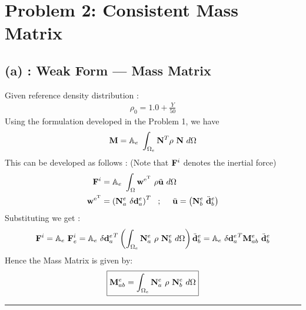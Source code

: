 \section*{Problem 2: Consistent Mass Matrix}
\subsection*{(a) : Weak Form --- Mass Matrix}
Given reference density distribution : 
\begin{align*}
\rho_0
=
1.0
+
\frac{Y}{50}
\end{align*}
Using the formulation developed in the Problem 1, we have \begin{align*}
{\bf M}
=
\mathbb{A}_e\ \int_{\Omega_e}
{\bf N}^T \rho \ {\bf N}\ d\Omega
\end{align*}
This can be developed as follows : (Note that ${\bf F}^i$ denotes the inertial force) 
\begin{align*}
{\bf F}^{i}
& = 
\mathbb{A}_e\ 
\int_{\Omega}
{\bf w}^{\rm e^{T}}\ \rho
\ddot{\bf u}\ d\Omega \\
{\bf w}^{\rm e^{T}}
& =
\left(
{\bf N}^e_a\ \delta {\bf d}^e_a
\right)^T \ \ ; \ \ \ \ \ddot{\bf u} = 
\left(
{\bf N}^e_b\ \ddot{\bf d}^e_b
\right)
\end{align*}
Substituting we get : 
\begin{align*}
{\bf F}^i
=
\mathbb{A}_e\ {\bf F}^i_e
=
\mathbb{A}_e
\ 
{\delta {\bf d}^e_a}^T \left(
\int_{\Omega_e}
{\bf N}^e_a\ \rho\ {\bf N}^e_b\ d\Omega \right)\ddot{\bf d}^e_b = \mathbb{A}_e
\ 
{\delta {\bf d}^e_a}^T {\bf M}^e_{ab}\ \ddot{\bf d}^e_b
\end{align*}
Hence the Mass Matrix is given by: 
\begin{align*}
\boxed{{\bf M}^e_{ab}
=
\int_{\Omega_e}
{\bf N}^e_a\ \rho\ {\bf N}^e_b\ d\Omega 
}
\end{align*}\hrule
